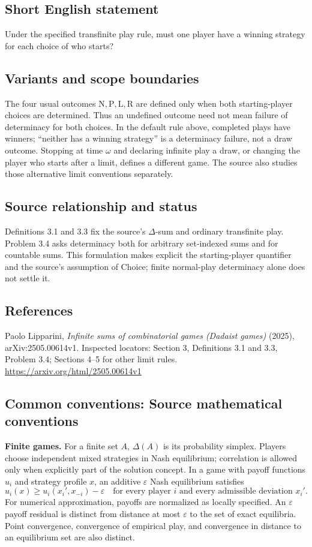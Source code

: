 \documentclass[11pt,a4paper]{article}
\begin{document}
\subsection*{Short English statement}
Under the specified transfinite play rule, must one player have a winning strategy for each choice of who starts?

\subsection*{Variants and scope boundaries}
The four usual outcomes $\mathrm N,\mathrm P,\mathrm L,\mathrm R$ are defined only when both starting-player choices are determined. Thus an undefined outcome need not mean failure of determinacy for both choices. In the default rule above, completed plays have winners; ``neither has a winning strategy'' is a determinacy failure, not a draw outcome. Stopping at time $\omega$ and declaring infinite play a draw, or changing the player who starts after a limit, defines a different game. The source also studies those alternative limit conventions separately.

\subsection*{Source relationship and status}
Definitions 3.1 and 3.3 fix the source's $\Delta$-sum and ordinary transfinite play. Problem 3.4 asks determinacy both for arbitrary set-indexed sums and for countable sums. This formulation makes explicit the starting-player quantifier and the source's assumption of Choice; finite normal-play determinacy alone does not settle it.

\subsection*{References}
\begingroup\footnotesize\raggedright
\noindent [S1] Paolo Lipparini, \emph{Infinite sums of combinatorial games (Dadaist games)} (2025), arXiv:2505.00614v1. Inspected locators: Section 3, Definitions 3.1 and 3.3, Problem 3.4; Sections 4--5 for other limit rules.
\url{https://arxiv.org/html/2505.00614v1}
\par\endgroup

\subsection*{Common conventions: Source mathematical conventions}

\textbf{Finite games.} For a finite set $A$, $\Delta(A)$ is its probability
simplex. Players choose independent mixed strategies in Nash equilibrium;
correlation is allowed only when explicitly part of the solution concept.
In a game with payoff functions $u_i$ and strategy profile $x$, an additive
$\varepsilon$ Nash equilibrium satisfies
\[
 u_i(x)\geq u_i(x_i',x_{-i})-\varepsilon
 \quad\text{for every player $i$ and every admissible deviation $x_i'$}.
\]
For numerical approximation, payoffs are normalized as locally specified.
An $\varepsilon$ payoff residual is distinct from distance at most
$\varepsilon$ to the set of exact equilibria. Point convergence, convergence
of empirical play, and convergence in distance to an equilibrium set are
also distinct.
\end{document}
